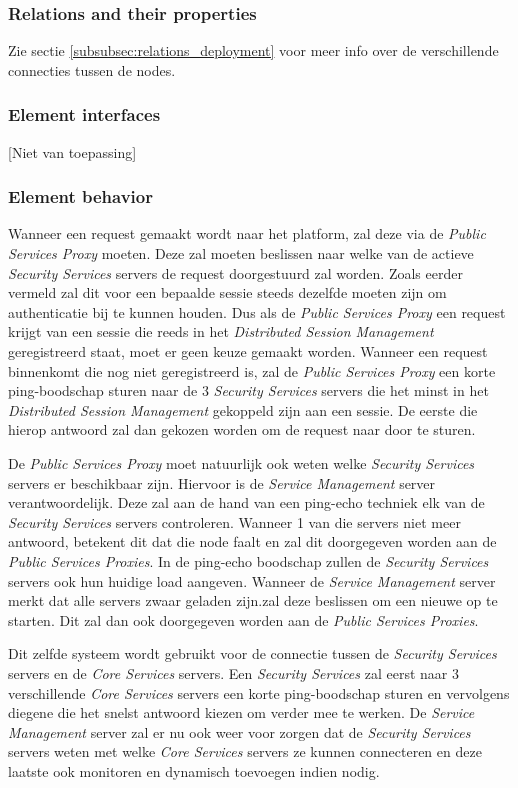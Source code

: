 \documentclass[a4paper,10pt]{article}
\begin{document}
\subsubsection{Relations and their properties}
Zie sectie \ref{subsubsec:relations_deployment} voor meer info over de verschillende connecties tussen de nodes.

\subsubsection{Element interfaces}
[Niet van toepassing]

\subsubsection{Element behavior}
Wanneer een request gemaakt wordt naar het platform, zal deze via de \textit{Public Services Proxy} moeten. Deze zal moeten beslissen naar welke van de actieve \textit{Security Services} servers de request doorgestuurd zal worden. Zoals eerder vermeld zal dit voor een bepaalde sessie steeds dezelfde moeten zijn om authenticatie bij te kunnen houden. Dus als de \textit{Public Services Proxy} een request krijgt van een sessie die reeds in het \textit{Distributed Session Management} geregistreerd staat, moet er geen keuze gemaakt worden. Wanneer een request binnenkomt die nog niet geregistreerd is, zal de \textit{Public Services Proxy} een korte ping-boodschap sturen naar de 3 \textit{Security Services} servers die het minst in het \textit{Distributed Session Management} gekoppeld zijn aan een sessie. De eerste die hierop antwoord zal dan gekozen worden om de request naar door te sturen.

De \textit{Public Services Proxy} moet natuurlijk ook weten welke \textit{Security Services} servers er beschikbaar zijn. Hiervoor is de \textit{Service Management} server verantwoordelijk. Deze zal aan de hand van een ping-echo techniek elk van de \textit{Security Services} servers controleren. Wanneer 1 van die servers niet meer antwoord, betekent dit dat die node faalt en zal dit doorgegeven worden aan de \textit{Public Services Proxies}. In de ping-echo boodschap zullen de \textit{Security Services} servers ook hun huidige load aangeven. Wanneer de \textit{Service Management} server merkt dat alle servers zwaar geladen zijn.zal deze beslissen om een nieuwe op te starten. Dit zal dan ook doorgegeven worden aan de \textit{Public Services Proxies}.

Dit zelfde systeem wordt gebruikt voor de connectie tussen de \textit{Security Services} servers en de \textit{Core Services} servers. Een \textit{Security Services} zal eerst naar 3 verschillende \textit{Core Services} servers een korte ping-boodschap sturen en vervolgens diegene die het snelst antwoord kiezen om verder mee te werken. De \textit{Service Management} server zal er nu ook weer voor zorgen dat de \textit{Security Services} servers weten met welke \textit{Core Services} servers ze kunnen connecteren en deze laatste ook monitoren en dynamisch toevoegen indien nodig.
\end{document}
